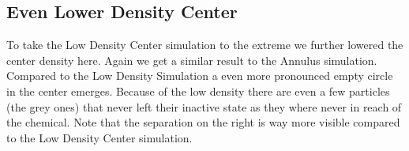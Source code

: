 \begin{minipage}{0.45\textwidth}
\subsection{Even Lower Density Center}
To take the Low Density Center simulation to the extreme we further lowered the center density here.
Again we get a similar result to the Annulus simulation.
Compared to the Low Density Simulation a even more pronounced empty circle in the center emerges.
Because of the low density there are even a few particles (the grey ones) that never left their inactive state as they where never in reach of the chemical.
Note that the separation on the right is way more visible compared to the Low Density Center simulation.
\end{minipage}